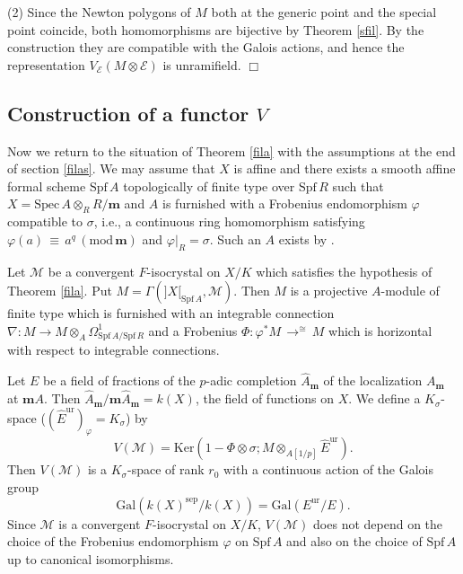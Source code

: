 \documentclass[11pt]{amsart}
\begin{document}
{ {(2) Since the Newton polygons of $M$ both at the generic point and the special point coincide, 
both homomorphisms are bijective by Theorem \ref{sfil}. By the construction 
they are compatible 
with the Galois actions, and hence the representation $V_{\mathcal E}(M \otimes \mathcal E)$ is unramifield. 
} \hspace*{\fill} $\Box$}

\subsection{Construction of a functor $V$}

Now we return to the situation of Theorem \ref{fila} with the assumptions at the end of section \ref{filas}. 
We may assume that $X$ is affine and there exists a smooth affine formal 
scheme $\mathrm{Spf}\, A$ 
topologically of finite type over $\mathrm{Spf}\, R$ such that $X = \mathrm{Spec}\, A \otimes_R R/\mathbf m$ 
and $A$ is furnished with a Frobenius endomorphism $\varphi$ compatible to $\sigma$, 
i.e., a continuous ring homomorphism satisfying $\varphi(a)\, \equiv\, a^q\, (\mathrm{mod}\, \mathbf m)$ and 
$\varphi|_R = \sigma$. Such an $A$ exists by \cite[Th\'eor\`eme 6]{El}. 

Let $\mathcal M$ be  a convergent $F$-isocrystal on $X/K$ which satisfies the 
hypothesis of Theorem \ref{fila}. 
Put $M = \Gamma(]X[_{\mathrm{Spf}\, A}, \mathcal M)$. Then $M$  
is a projective $A$-module of finite type which is furnished with an integrable connection 
$\nabla : M \rightarrow M\otimes_A \Omega_{\mathrm{Spf}\, A/\mathrm{Spf}\, R}^1$ 
and a Frobenius $\Phi : \varphi^\ast M\, \displaystyle{\mathop{\rightarrow}^{\cong}}\, M$ which is 
horizontal with respect to integrable connections. 

Let $E$ be a field of fractions of the $p$-adic completion $\widehat{A}_{\mathbf m}$ 
of the localization $A_{\mathbf m}$ at $\mathbf mA$. Then $\widehat{A}_{\mathbf m}/\mathbf m\widehat{A}_{\mathbf m} = k(X)$, 
the field of functions on $X$. 
We define a $K_\sigma$-space ($(\widehat{E}^{\mathrm{ur}})_\varphi = K_\sigma$) by 
$$
    V(\mathcal M) = \mathrm{Ker}(1 -\Phi\otimes\sigma; M \otimes_{A[1/p]}\widehat{E}^{\mathrm{ur}}). 
$$
Then $V(\mathcal M)$ is a $K_\sigma$-space of rank $r_0$ 
with a continuous action of the Galois group 
$$
      \mathrm{Gal}(k(X)^{\mathrm{sep}}/k(X)) = \mathrm{Gal}(E^{\mathrm{ur}}/E). 
$$
Since $\mathcal M$ is a convergent $F$-isocrystal on $X/K$, $V(\mathcal M)$ does not depend on the choice of the Frobenius 
endomorphism $\varphi$ on $\mathrm{Spf}\, A$ and also on the choice of $\mathrm{Spf}\, A$ up to canonical isomorphisms. 
\end{document}
